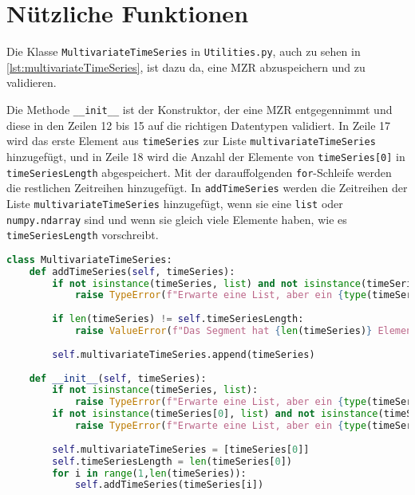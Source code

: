\section{Nützliche Funktionen}
Die Klasse \lstinline|MultivariateTimeSeries| in \texttt{Utilities.py}, auch zu sehen in \autoref{lst:multivariateTimeSeries}, ist dazu da, eine \ac{MZR} abzuspeichern und zu validieren.

Die Methode \lstinline{__init__} ist der Konstruktor, der eine \ac{MZR} entgegennimmt und diese in den Zeilen 12 bis 15 auf die richtigen Datentypen validiert. In Zeile 17 wird das erste Element aus \lstinline|timeSeries| zur Liste \lstinline|multivariateTimeSeries| hinzugefügt, und in Zeile 18 wird die Anzahl der Elemente von \lstinline|timeSeries[0]| in \lstinline|timeSeriesLength| abgespeichert. Mit der darauffolgenden \lstinline|for|-Schleife werden die restlichen Zeitreihen hinzugefügt. In \lstinline|addTimeSeries| werden die Zeitreihen der Liste \lstinline|multivariateTimeSeries| hinzugefügt, wenn sie eine \lstinline|list| oder \lstinline|numpy.ndarray| sind und wenn sie gleich viele Elemente haben, wie es \lstinline|timeSeriesLength| vorschreibt. 
\begin{lstlisting}[caption=Klasse für \ac{MZR}, language=Python, label=lst:multivariateTimeSeries, style=Python]
class MultivariateTimeSeries:
    def addTimeSeries(self, timeSeries):
        if not isinstance(timeSeries, list) and not isinstance(timeSeries, np.ndarray):
            raise TypeError(f"Erwarte eine List, aber ein {type(timeSeries)} erhalten.")
        
        if len(timeSeries) != self.timeSeriesLength:
            raise ValueError(f"Das Segment hat {len(timeSeries)} Element(e), muss aber {self.timeSeriesLength} haben.")
        
        self.multivariateTimeSeries.append(timeSeries)
    
    def __init__(self, timeSeries):
        if not isinstance(timeSeries, list):
            raise TypeError(f"Erwarte eine List, aber ein {type(timeSeries)} erhalten.")
        if not isinstance(timeSeries[0], list) and not isinstance(timeSeries[0], np.ndarray):
            raise TypeError(f"Erwarte eine List, aber ein {type(timeSeries[0])} erhalten.")
        
        self.multivariateTimeSeries = [timeSeries[0]]
        self.timeSeriesLength = len(timeSeries[0])
        for i in range(1,len(timeSeries)):
            self.addTimeSeries(timeSeries[i])
\end{lstlisting}

